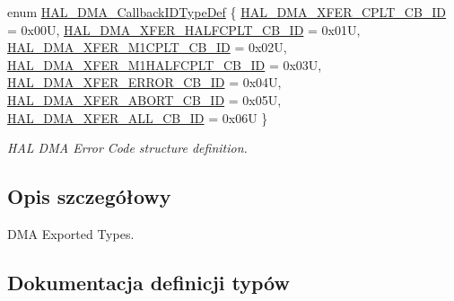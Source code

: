 \begin{DoxyCompactItemize}
\item 
enum \hyperlink{group___d_m_a___exported___types_gafbe8b2bd9ce2128de6cdc08ccde7e8ad}{H\+A\+L\+\_\+\+D\+M\+A\+\_\+\+Callback\+I\+D\+Type\+Def} \{ \newline
\hyperlink{group___d_m_a___exported___types_ggafbe8b2bd9ce2128de6cdc08ccde7e8ada7d4463d9db2e6d15282128b44ae08e12}{H\+A\+L\+\_\+\+D\+M\+A\+\_\+\+X\+F\+E\+R\+\_\+\+C\+P\+L\+T\+\_\+\+C\+B\+\_\+\+ID} = 0x00U, 
\hyperlink{group___d_m_a___exported___types_ggafbe8b2bd9ce2128de6cdc08ccde7e8ada4b1606f39a4eec41d958bc878719f046}{H\+A\+L\+\_\+\+D\+M\+A\+\_\+\+X\+F\+E\+R\+\_\+\+H\+A\+L\+F\+C\+P\+L\+T\+\_\+\+C\+B\+\_\+\+ID} = 0x01U, 
\hyperlink{group___d_m_a___exported___types_ggafbe8b2bd9ce2128de6cdc08ccde7e8ada09feb1bab1c32b35afd27b9316958051}{H\+A\+L\+\_\+\+D\+M\+A\+\_\+\+X\+F\+E\+R\+\_\+\+M1\+C\+P\+L\+T\+\_\+\+C\+B\+\_\+\+ID} = 0x02U, 
\hyperlink{group___d_m_a___exported___types_ggafbe8b2bd9ce2128de6cdc08ccde7e8adac2e68a660d9830fa1e965482b9befbb9}{H\+A\+L\+\_\+\+D\+M\+A\+\_\+\+X\+F\+E\+R\+\_\+\+M1\+H\+A\+L\+F\+C\+P\+L\+T\+\_\+\+C\+B\+\_\+\+ID} = 0x03U, 
\newline
\hyperlink{group___d_m_a___exported___types_ggafbe8b2bd9ce2128de6cdc08ccde7e8ada3e76bc89154e0b50333cc551bf0337a6}{H\+A\+L\+\_\+\+D\+M\+A\+\_\+\+X\+F\+E\+R\+\_\+\+E\+R\+R\+O\+R\+\_\+\+C\+B\+\_\+\+ID} = 0x04U, 
\hyperlink{group___d_m_a___exported___types_ggafbe8b2bd9ce2128de6cdc08ccde7e8ada3059a9412e0624699e9123ba2bccdf3e}{H\+A\+L\+\_\+\+D\+M\+A\+\_\+\+X\+F\+E\+R\+\_\+\+A\+B\+O\+R\+T\+\_\+\+C\+B\+\_\+\+ID} = 0x05U, 
\hyperlink{group___d_m_a___exported___types_ggafbe8b2bd9ce2128de6cdc08ccde7e8adac9935fd906719942d6b09cfd55e837f0}{H\+A\+L\+\_\+\+D\+M\+A\+\_\+\+X\+F\+E\+R\+\_\+\+A\+L\+L\+\_\+\+C\+B\+\_\+\+ID} = 0x06U
 \}\begin{DoxyCompactList}\small\item\em H\+AL D\+MA Error Code structure definition. \end{DoxyCompactList}
\end{DoxyCompactItemize}


\subsection{Opis szczegółowy}
D\+MA Exported Types. 



\subsection{Dokumentacja definicji typów}
\mbox{\label{group___d_m_a___exported___types_ga41b754a906b86bce54dc79938970138b}} 
